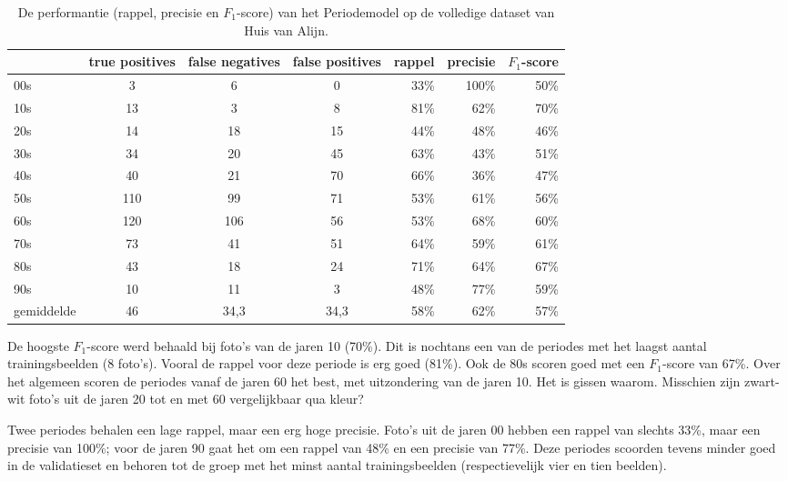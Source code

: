 \begin{table}
	\centering
    \renewcommand\arraystretch{1.2}
    \begin{tabular}{l|ccc|rrr}
        \toprule
        & true positives  & false negatives & false positives & rappel & precisie & $F_1$-score \\ 
        \midrule
        00s & 3 & 6 & 0 & 33\% & 100\% & 50\% \\ 
        10s & 13 & 3 & 8 &  81\% & 62\% & 70\% \\ 
        20s & 14 & 18 & 15 & 44\% & 48\% & 46\% \\ 
        30s & 34 & 20 & 45  & 63\% & 43\% & 51\% \\ 
        40s & 40 & 21 & 70  & 66\% & 36\% & 47\% \\ 
        50s & 110 & 99 & 71  & 53\% & 61\% & 56\% \\ 
        60s & 120 & 106 & 56  & 53\% & 68\% & 60\% \\ 
        70s & 73 & 41 & 51  & 64\% & 59\% & 61\% \\ 
        80s & 43 & 18 & 24  & 71\% & 64\% & 67\% \\ 
        90s & 10 & 11 & 3  & 48\% & 77\% & 59\% \\ 
        \midrule
        gemiddelde & 46 & 34,3 & 34,3  & 58\% & 62\% & 57\% \\ 
        \bottomrule
    \end{tabular} 
    \caption[Scores van het Periodemodel op de volledige dataset]{De performantie (rappel, precisie en $F_1$-score) van het Periodemodel op de volledige dataset van Huis van Alijn.}
    \label{tab:resultaten-periodemodel}
\end{table}

De hoogste $F_1$-score werd behaald bij foto’s van de jaren 10 (70\%). Dit is nochtans een van de periodes met het laagst aantal trainingsbeelden (8 foto's). Vooral de rappel voor deze periode is erg goed (81\%). Ook de 80s scoren goed met een $F_1$-score van 67\%. Over het algemeen scoren de periodes vanaf de jaren 60 het best, met uitzondering van de jaren 10. Het is gissen waarom. Misschien zijn zwart-wit foto’s uit de jaren 20 tot en met 60 vergelijkbaar qua kleur?

Twee periodes behalen een lage rappel, maar een erg hoge precisie. Foto’s uit de jaren 00 hebben een rappel van slechts 33\%, maar een precisie van 100\%; voor de jaren 90 gaat het om een rappel van 48\% en een precisie van 77\%. Deze periodes scoorden tevens minder goed in de validatieset en behoren tot de groep met het minst aantal trainingsbeelden (respectievelijk vier en tien beelden). 

